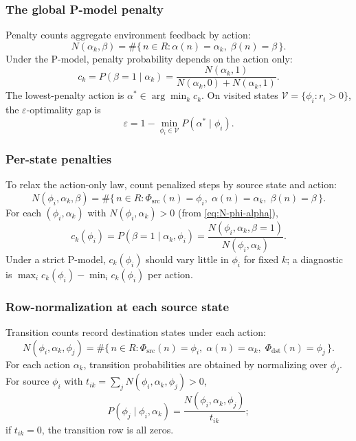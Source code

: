 \documentclass[11pt,a4paper]{article}
\begin{document}
\subsubsection{The global P-model penalty}\label{sec:est:globalpen}
Penalty counts aggregate environment feedback by action:
\begin{equation}
  N(\alpha_k,\beta)
  = \#\{\, n\in R : \alpha(n)=\alpha_k,\; \beta(n)=\beta \,\}.
  \label{eq:N-alpha-beta}
\end{equation}
Under the P-model, penalty probability depends on the action only:
\begin{equation}
  c_k = P(\beta{=}1\mid\alpha_k)
  = \frac{N(\alpha_k,1)}{N(\alpha_k,0)+N(\alpha_k,1)}.
  \label{eq:ck-global}
\end{equation}
The lowest-penalty action is $\alpha^\ast\in\arg\min_k c_k$.
On visited states $\mathcal{V}=\{\phi_i : r_i>0\}$, the $\varepsilon$-optimality gap is
\begin{equation}
  \varepsilon = 1 - \min_{\phi_i\in\mathcal{V}} P(\alpha^\ast\mid\phi_i).
  \label{eq:epsilon}
\end{equation}

\subsubsection{Per-state penalties}\label{sec:est:perstate}
To relax the action-only law, count penalized steps by source state and action:
\begin{equation}
  N(\phi_i,\alpha_k,\beta)
  = \#\{\, n\in R : \Phi_{\mathrm{src}}(n)=\phi_i,\;
  \alpha(n)=\alpha_k,\; \beta(n)=\beta \,\}.
  \label{eq:N-phi-alpha-beta}
\end{equation}
For each $(\phi_i,\alpha_k)$ with $N(\phi_i,\alpha_k)>0$ (from \eqref{eq:N-phi-alpha}),
\begin{equation}
  c_k(\phi_i) = P(\beta{=}1\mid\alpha_k,\phi_i)
  = \frac{N(\phi_i,\alpha_k,\beta{=}1)}{N(\phi_i,\alpha_k)}.
  \label{eq:ck-perstate}
\end{equation}
Under a strict P-model, $c_k(\phi_i)$ should vary little in $\phi_i$ for fixed $k$;
a diagnostic is $\max_i c_k(\phi_i)-\min_i c_k(\phi_i)$ per action.

\subsubsection{Row-normalization at each source state}\label{sec:est:rownorm}
Transition counts record destination states under each action:
\begin{equation}
  N(\phi_i,\alpha_k,\phi_j)
  = \#\{\, n\in R : \Phi_{\mathrm{src}}(n)=\phi_i,\;
  \alpha(n)=\alpha_k,\; \Phi_{\mathrm{dst}}(n)=\phi_j \,\}.
  \label{eq:N-transition}
\end{equation}
For each action $\alpha_k$, transition probabilities are obtained by
normalizing over $\phi_j$. For source $\phi_i$ with
$t_{ik}=\sum_j N(\phi_i,\alpha_k,\phi_j)>0$,
\begin{equation}
  P(\phi_j\mid\phi_i,\alpha_k)
  = \frac{N(\phi_i,\alpha_k,\phi_j)}{t_{ik}};
  \label{eq:transition}
\end{equation}
if $t_{ik}=0$, the transition row is all zeros.
\end{document}

